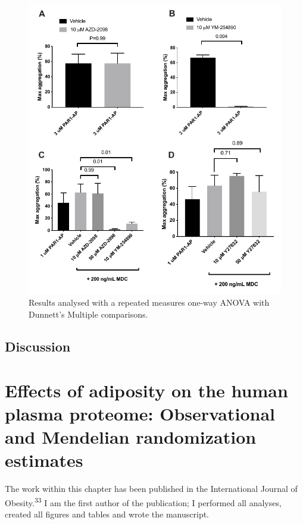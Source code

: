 \documentclass[11pt,twoside]{bristolthesis}
\begin{document}
\begin{figure}
\includegraphics{figure/Chemokines/Layouts/PAR1_MDC_inhibitors_aggregation} \caption[The effect of inhibitors on PAR1-AP and MDC induced aggregation in PRP.]{Results analysed with a repeated measures one-way ANOVA with Dunnett's Multiple comparisons.}\label{fig:MDC-PRP-agg-bar}
\end{figure}
\hypertarget{discussion-2}{%
\section{Discussion}\label{discussion-2}}

\hypertarget{BMI-protein-MR}{%
\chapter{Effects of adiposity on the human plasma proteome: Observational and Mendelian randomization estimates}\label{BMI-protein-MR}}

The work within this chapter has been published in the International Journal of Obesity.\textsuperscript{33} I am the first author of the publication; I performed all analyses, created all figures and tables and wrote the manuscript.
\end{document}
